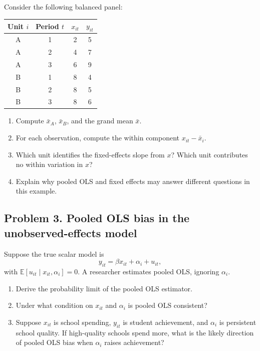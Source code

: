 \documentclass[11pt]{article}
\newcommand{\E}{\mathbb{E}}
\begin{document}
Consider the following balanced panel:

\begin{center}
\begin{tabular}{cccc}
\toprule
Unit $i$ & Period $t$ & $x_{it}$ & $y_{it}$ \\
\midrule
A & 1 & 2 & 5 \\
A & 2 & 4 & 7 \\
A & 3 & 6 & 9 \\
B & 1 & 8 & 4 \\
B & 2 & 8 & 5 \\
B & 3 & 8 & 6 \\
\bottomrule
\end{tabular}
\end{center}

\begin{enumerate}[label=(\alph*)]
\item Compute $\bar{x}_A$, $\bar{x}_B$, and the grand mean $\bar{x}$.
\item For each observation, compute the within component $x_{it}-\bar{x}_i$.
\item Which unit identifies the fixed-effects slope from $x$? Which unit contributes no within variation in $x$?
\item Explain why pooled OLS and fixed effects may answer different questions in this example.
\end{enumerate}

\subsection*{Problem 3. Pooled OLS bias in the unobserved-effects model}

Suppose the true scalar model is
\[
y_{it}=\beta x_{it}+\alpha_i+u_{it},
\]
with $\E[u_{it}\mid x_{it},\alpha_i]=0$. A researcher estimates pooled OLS, ignoring $\alpha_i$.

\begin{enumerate}[label=(\alph*)]
\item Derive the probability limit of the pooled OLS estimator.
\item Under what condition on $x_{it}$ and $\alpha_i$ is pooled OLS consistent?
\item Suppose $x_{it}$ is school spending, $y_{it}$ is student achievement, and $\alpha_i$ is persistent school quality. If high-quality schools spend more, what is the likely direction of pooled OLS bias when $\alpha_i$ raises achievement?
\end{enumerate}
\end{document}
